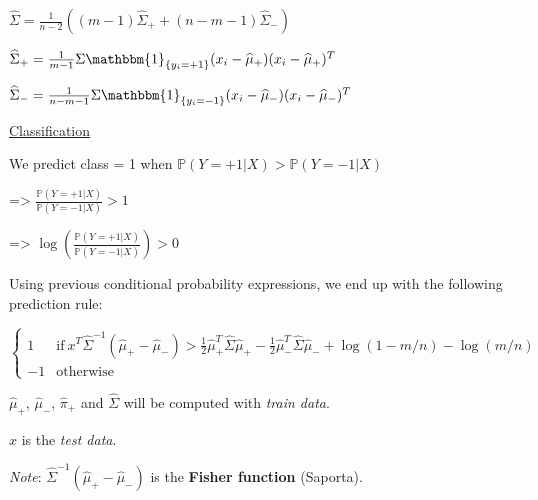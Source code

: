 $\widehat{\Sigma} = \frac{1}{n-2} ((m-1) \widehat{\Sigma}_+ + (n-m-1)\widehat{\Sigma}_-)$

$\widehat{\Sigma}_+ = \frac{1}{m-1} \Sigma \mathbbm{1}_{\{y_i=+1\}}(x_i-\widehat{\mu}_+)(x_i-\widehat{\mu}_+)^T$

$\widehat{\Sigma}_- = \frac{1}{n-m-1} \Sigma \mathbbm{1}_{\{y_i=-1\}}(x_i-\widehat{\mu}_-)(x_i-\widehat{\mu}_-)^T$

 \vspace{3mm}

\underline{Classification}

We predict class = 1 when $\mathbb{P}(Y=+1 | X) > \mathbb{P}(Y=-1 | X)$

=> $\frac{\mathbb{P}(Y=+1 | X)}{\mathbb{P}(Y=-1 | X)} > 1$

=> $\log(\frac{\mathbb{P}(Y=+1 | X)}{\mathbb{P}(Y=-1 | X)}) > 0$

Using previous conditional probability expressions, we end up with the following prediction rule:

  \begin{equation}
    \begin{cases}
      1 & \text{if}\ x^T\widehat{\Sigma}^{-1}(\widehat{\mu}_+ - \widehat{\mu}_-) > \frac{1}{2}\widehat{\mu}_+^T\widehat{\Sigma}\widehat{\mu}_+ - \frac{1}{2}\widehat{\mu}_-^T\widehat{\Sigma}\widehat{\mu}_- + \log(1-m/n) - \log(m/n) \\
      -1 & \text{otherwise}
    \end{cases}
  \end{equation}

$\widehat{\mu}_+$, $\widehat{\mu}_-$, $\widehat{\pi}_+$ and $\widehat{\Sigma}$ will be computed with \textit{train data}.

 $x$ is the \textit{test data}.

\vspace{3mm}

\textit{Note}: $\widehat{\Sigma}^{-1}(\widehat{\mu}_+ - \widehat{\mu}_-)$ is the \textbf{Fisher function} (Saporta).

